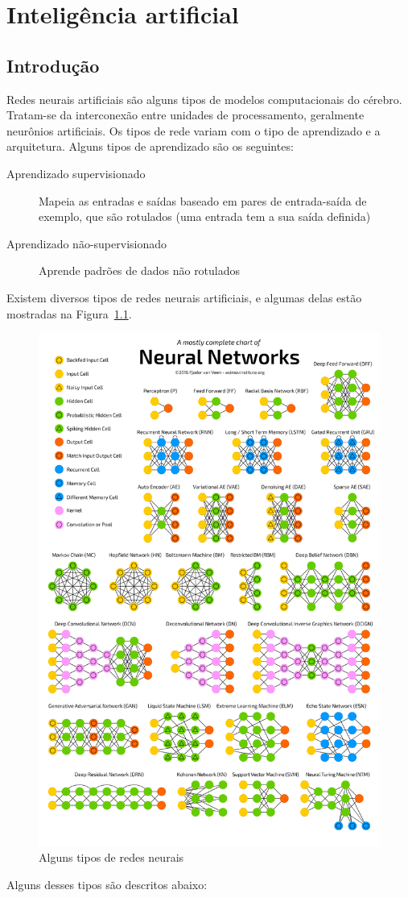 \chapter{Inteligência artificial}\label{cap:ia}
\section{Introdução}\label{sec:ia_intro}
Redes neurais artificiais são alguns tipos de modelos computacionais do cérebro. Tratam-se da interconexão entre unidades de processamento, geralmente neurônios artificiais. Os tipos de rede variam com o tipo de aprendizado e a arquitetura. Alguns tipos de aprendizado são os seguintes:

\begin{description}
	\item[Aprendizado supervisionado] Mapeia as entradas e saídas baseado em pares de entrada-saída de exemplo, que são rotulados (uma entrada tem a sua saída definida)
	\item[Aprendizado não-supervisionado] Aprende padrões de dados não rotulados
\end{description}

Existem diversos tipos de redes neurais artificiais, e algumas delas estão mostradas na Figura~\ref{fig:neuraltypes}.

\begin{figure}[h!]
	\centering
	\caption{Alguns tipos de redes neurais}
	\label{fig:neuraltypes}
	\includegraphics[width=0.34\linewidth]{figs/neural_types}
\end{figure}

Alguns desses tipos são descritos abaixo:

